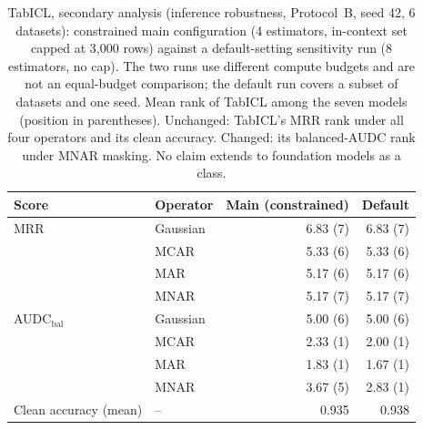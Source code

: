 \begin{table}[t]
\centering
\footnotesize
\caption{TabICL, secondary analysis (inference robustness, Protocol~B, seed 42, 6 datasets): constrained main configuration (4 estimators, in-context set capped at 3,000 rows) against a default-setting sensitivity run (8 estimators, no cap). The two runs use different compute budgets and are not an equal-budget comparison; the default run covers a subset of datasets and one seed. Mean rank of TabICL among the seven models (position in parentheses). Unchanged: TabICL's MRR rank under all four operators and its clean accuracy. Changed: its balanced-AUDC rank under MNAR masking. No claim extends to foundation models as a class.}
\label{tab:tabicl_configs}
\begin{tabular}{@{}llrr@{}}
\toprule
Score & Operator & Main (constrained) & Default \\
\midrule
MRR & Gaussian & 6.83 (7) & 6.83 (7) \\
 & MCAR & 5.33 (6) & 5.33 (6) \\
 & MAR & 5.17 (6) & 5.17 (6) \\
 & MNAR & 5.17 (7) & 5.17 (7) \\
\midrule
AUDC$_{\mathrm{bal}}$ & Gaussian & 5.00 (6) & 5.00 (6) \\
 & MCAR & 2.33 (1) & 2.00 (1) \\
 & MAR & 1.83 (1) & 1.67 (1) \\
 & MNAR & 3.67 (5) & 2.83 (1) \\
\midrule
Clean accuracy (mean) & -- & 0.935 & 0.938 \\
\bottomrule
\end{tabular}
\end{table}
